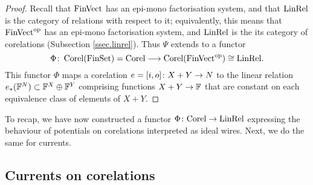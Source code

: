 \begin{proof}
Recall that $\mathrm{FinVect}$ has an epi-mono factorisation system, and that $\mathrm{LinRel}$
is the category of relations with respect to it; equivalently, this means that
$\mathrm{FinVect}^{\mathrm{op}}$ has an epi-mono factorisation system, and $\mathrm{LinRel}$ is the its
category of corelations (Subsection \ref{ssec.linrel}). Thus $\Psi$ extends to a
functor 
\[
  \Phi{\colon} \operatorname{{Corel}}(\mathrm{FinSet}) = \mathrm{Corel} \longrightarrow
  \operatorname{{Corel}}(\mathrm{FinVect}^{\mathrm{op}}) \cong \mathrm{LinRel}.
\]
This functor $\Phi$ maps a corelation $e= [i,o]{\colon} X+Y \to N$ to the linear
relation $e_\ast({\mathbb F}^N) \subset {\mathbb F}^X \oplus {\mathbb F}^Y$ comprising functions $X+Y \to
{\mathbb F}$ that are constant on each equivalence class of elements of $X+Y$.
\end{proof}

To recap, we have now constructed a functor $\Phi{\colon} \mathrm{Corel} \to
\mathrm{LinRel}$ expressing the behaviour of potentials on corelations interpreted
as ideal wires. Next, we do the same for currents.

\subsection{Currents on corelations}

